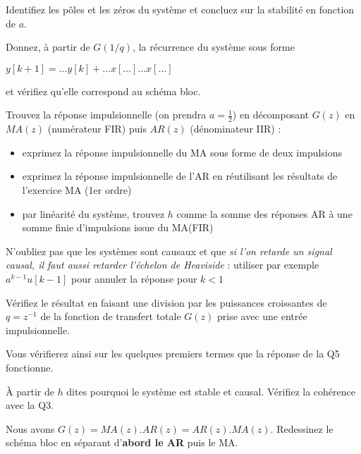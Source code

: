 Identifiez les pôles et les zéros du système et concluez sur la stabilité en fonction de $a$.

Donnez, à partir de $G(1/q)$, la récurrence  du système sous forme

$y[k+1]= \ldots y[k] + \ldots x[\ldots] \ldots x[\ldots]$

et vérifiez qu'elle correspond au schéma bloc.

Trouvez la réponse impulsionnelle (on prendra $a=\frac{1}{2}$) en décomposant $G(z)$ en $MA(z)$ (numérateur FIR) puis $AR(z)$ (dénominateur IIR) :
\begin{itemize}
\item exprimez la réponse impulsionnelle du MA sous forme de deux
  impulsions
\item exprimez la réponse impulsionnelle de l'AR en réutilisant
  les résultats de l'exercice MA (1er ordre)
\item par linéarité du
  système, trouvez $h$ comme la somme des réponses AR à une somme
  finie d'impulsions issue du MA(FIR)
\end{itemize}

\begin{remarque}
N'oubliez pas que les systèmes sont causaux et que \emph{si l'on
  retarde un signal causal, il faut aussi retarder l'échelon de
  Heaviside} : utiliser par exemple $a^{k-1}u[k-1]$ pour annuler la
réponse pour $k<1$
\end{remarque}

Vérifiez le résultat en faisant une division par les puissances croissantes de $q = z^{-1}$ de la fonction de transfert totale $G(z)$ prise avec une entrée impulsionnelle. 

Vous vérifierez ainsi sur les quelques premiers termes que la réponse de la Q5 fonctionne.

À partir de $h$ dites pourquoi le système est stable et causal. Vérifiez la cohérence avec la Q3.



Nous avons $G(z) = MA(z).AR(z) = AR(z).MA(z)$.  
Redessinez le schéma bloc en séparant d'\textbf{abord le AR} puis le MA.  


